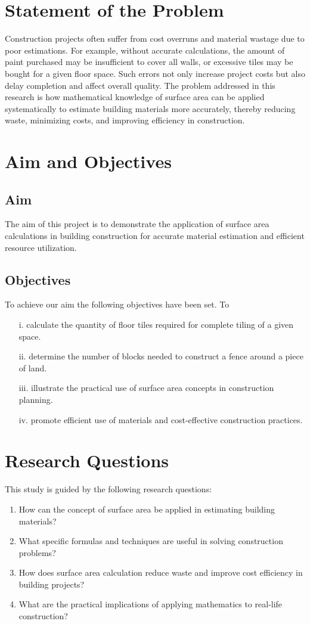 \documentclass[12pt,a4paper,openany,titlepage,reqno, final]{report}
\theoremstyle{definition}
\begin{document}
\section{Statement of the Problem}
\noindent Construction projects often suffer from cost overruns and material wastage due to poor estimations. For example, without accurate calculations, the amount of paint purchased may be insufficient to cover all walls, or excessive tiles may be bought for a given floor space. Such errors not only increase project costs but also delay completion and affect overall quality. The problem addressed in this research is how mathematical knowledge of surface area can be applied systematically to estimate building materials more accurately, thereby reducing waste, minimizing costs, and improving efficiency in construction.

\section{Aim and Objectives}
\subsection*{Aim}
The aim of this project is to demonstrate the application of surface area calculations in building construction for accurate material estimation and efficient resource utilization.

\subsection*{Objectives}
To achieve our aim the following objectives have been set. To
\begin{itemize}
	\item[i.]  calculate the quantity of floor tiles required for complete tiling of a given space.
	\item[ii.]  determine the number of blocks needed to construct a fence around a piece of land.
	\item[iii.]  illustrate the practical use of surface area concepts in construction planning.
	\item[iv.] promote efficient use of materials and cost-effective construction practices.
\end{itemize}

\section{Research Questions}
This study is guided by the following research questions:
\begin{enumerate}
	\item How can the concept of surface area be applied in estimating building materials?
	\item What specific formulas and techniques are useful in solving construction problems?
	\item How does surface area calculation reduce waste and improve cost efficiency in building projects?
	\item What are the practical implications of applying mathematics to real-life construction?
\end{enumerate}
\end{document}
